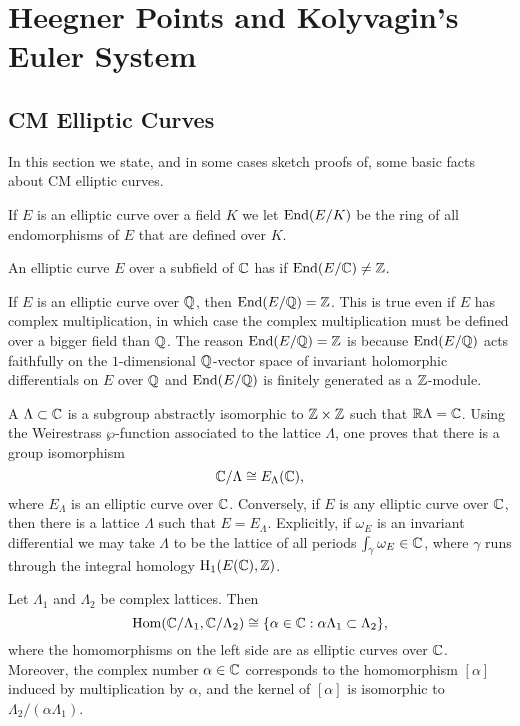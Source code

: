 \chapter{Heegner Points and Kolyvagin's Euler System}
\section{CM Elliptic Curves}
In this section we state, and in some cases sketch proofs
of, some basic facts about CM elliptic curves. 

If $E$ is an elliptic curve over a field $K$ we let $\operatorname{End}(E/K)$ be the
ring of all endomorphisms of $E$ that are defined over $K$.

\begin{definition} 
An elliptic curve $E$ over a subfield of $\mathbb{C}$
has  if $\operatorname{End}(E/\mathbb{C})\neq \mathbb{Z}$.
\end{definition}

\begin{remark}
If $E$ is an elliptic curve over $\mathbb{Q}$, then $\operatorname{End}(E/\mathbb{Q}) = \mathbb{Z}$.
This is true even if $E$ has complex multiplication,
in which case the complex multiplication must be defined over a bigger
field than $\mathbb{Q}$.  The reason $\operatorname{End}(E/\mathbb{Q}) = \mathbb{Z}$ is because
$\operatorname{End}(E/\mathbb{Q})$ acts faithfully on the $1$-dimensional
$\mathbb{Q}$-vector space of invariant holomorphic
differentials on $E$ over $\mathbb{Q}$ and 
$\operatorname{End}(E/\mathbb{Q})$ is finitely generated
as a $\mathbb{Z}$-module.
\end{remark}

A  $\Lambda \subset \mathbb{C}$ is a subgroup abstractly
isomorphic to $\mathbb{Z}\times \mathbb{Z}$ such that $\mathbb{R}\Lambda = \mathbb{C}$.
Using the Weirestrass $\wp$-function associated to the lattice
$\Lambda$, one proves that there is a group isomorphism
$$
  \mathbb{C}/\Lambda \cong E_{\Lambda}(\mathbb{C}),
$$
where $E_{\Lambda}$ is an elliptic curve over $\mathbb{C}$. 
Conversely, if $E$ is any elliptic curve over $\mathbb{C}$,
then there is a lattice $\Lambda$ such that $E = E_{\Lambda}$. 
Explicitly, if $\omega_E$ is an invariant differential
we may take $\Lambda$ to be
the lattice of all periods $\int_{\gamma} \omega_E\in \mathbb{C}$, where 
$\gamma$ runs through the integral homology $\operatorname{H}_1(E(\mathbb{C}),\mathbb{Z})$.

\begin{proposition}\label{prop:cend}
Let $\Lambda_1$ and $\Lambda_2$ be complex lattices.  Then
$$
  \operatorname{Hom}(\mathbb{C}/\Lambda_1, \mathbb{C}/\Lambda_2) 
  \cong \{ \alpha \in \mathbb{C} : \alpha \Lambda_1 \subset \Lambda_2\},
$$
where the homomorphisms on the left side are as elliptic 
curves over $\mathbb{C}$.  Moreover, the complex number $\alpha \in \mathbb{C}$
corresponds to the homomorphism $[\alpha]$ 
induced by multiplication by $\alpha$,
and the kernel of $[\alpha]$ is isomorphic to $\Lambda_2 / (\alpha \Lambda_1)$.
\end{proposition}


